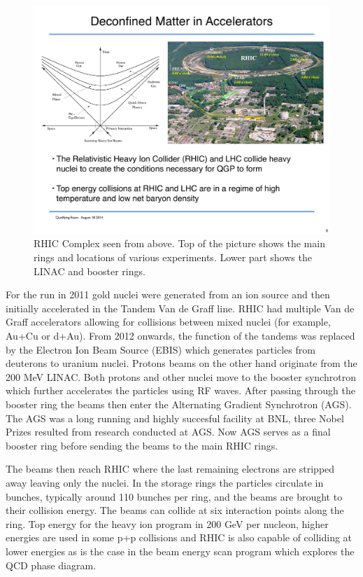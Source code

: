 \begin{figure}[htbp]
\begin{center}
\includegraphics[scale=0.7]{Plots/Detector/RHIC_Complex.pdf}
\end{center}
\caption[RHIC Facility]{RHIC Complex seen from above. Top of the picture shows the main rings and locations of various experiments. Lower part shows the LINAC and booster rings.}
\label{fig:RHIC}
\end{figure}

For the run in 2011 gold nuclei were generated from an ion source and then initially accelerated in the Tandem Van de Graff line. RHIC had multiple Van de Graff accelerators allowing for collisions between mixed nuclei (for example, Au+Cu or d+Au). From 2012 onwards, the function of the tandems was replaced by the Electron Ion Beam Source (EBIS) which generates particles from deuterons to uranium nuclei. Protons beams on the other hand originate from the 200 MeV LINAC. Both protons and other nuclei move to the booster synchrotron which further accelerates the particles using RF waves. After passing through the booster ring the beams then enter the Alternating Gradient Synchrotron (AGS). The AGS was a long running and highly succesful facility at BNL, three Nobel Prizes resulted from research conducted at AGS. Now AGS serves as a final booster ring before sending the beams to the main RHIC rings. 

The beams then reach RHIC where the last remaining electrons are stripped away leaving only the nuclei. In the storage rings the particles circulate in bunches, typically around 110 bunches per ring, and the beams are brought to their collision energy. The beams can collide at six interaction points along the ring. Top energy for the heavy ion program in 200 GeV per nucleon, higher energies are used in some p+p collisions and RHIC is also capable of colliding at lower energies as is the case in the beam energy scan program which explores the QCD phase diagram.

